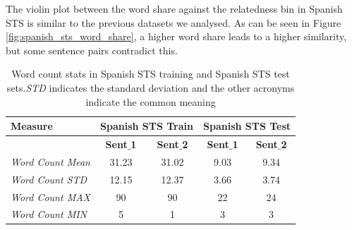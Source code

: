 \begin{enumerate}
The violin plot between the word share against the relatedness bin in Spanish STS is similar to the previous datasets we analysed. As can be seen in Figure \ref{fig:spanish_sts_word_share}, a higher word share leads to a higher similarity, but some sentence pairs contradict this.


\begin{table}
	\centering
	\begin{tabular}{l|cc|cc}
		\hline
		Measure   & \multicolumn{2}{c|}{Spanish STS Train} & \multicolumn{2}{c}{Spanish STS Test} \\
		\hline
		\multicolumn{1}{l|}{} & \textbf{Sent$\_$1} & \textbf{Sent$\_$2} & \textbf{Sent$\_$1} & \textbf{Sent$\_$2} \\
		\textit{Word Count Mean} & 31.23 & 31.02 & 9.03 & 9.34  \\
		\textit{Word Count STD} & 12.15 & 12.37 & 3.66 & 3.74  \\
		\textit{Word Count MAX} & 90 & 90 & 22 & 24  \\
		\textit{Word Count MIN} & 5 & 1 & 3 & 3  \\
		\hline
	\end{tabular}
	\caption[Word count stats in Spanish STS]{Word count stats in Spanish STS training and Spanish STS test sets.\textit{STD} indicates the standard deviation and the other acronyms indicate the common meaning }
	\label{table:spanish_sts}
\end{table}

	
\end{enumerate}



